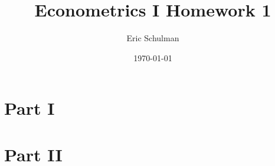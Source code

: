 \documentclass{article}
\title{Econometrics I Homework 1}
\author{Eric Schulman}
\date{\today}
\begin{document}
\maketitle
\thispagestyle{empty}

\section{Part I}

\pagebreak
\section{Part II}
\end{document}

